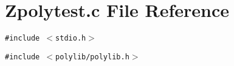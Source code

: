 \section{Zpolytest.c File Reference}
\label{Zpolytest_8c}
{\tt \#include $<$stdio.h$>$}\par
{\tt \#include $<$polylib/polylib.h$>$}\par
